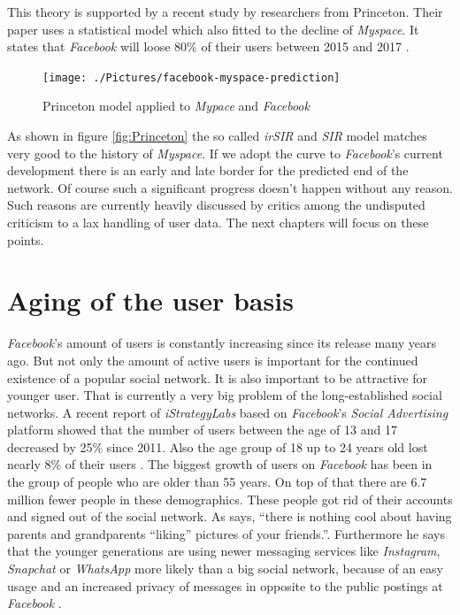 \documentclass[11pt,a4paper]{report}
\begin{document}
This theory is supported by a recent study by researchers from Princeton. Their paper uses a statistical model which also fitted to the decline of \emph{Myspace}. It states that \emph{Facebook} will loose 80\% of their users between 2015 and 2017 \cite{Cannarella:2014aa}. 
\begin{figure}[h]
    \centering
      \texttt{[image: ./Pictures/facebook-myspace-prediction]}
      \caption[Princeton model applied to \emph{Mypace} and \emph{Facebook} retrieved from \cite{Cannarella:2014aa}]{Princeton model applied to \emph{Mypace} and \emph{Facebook}}
      \label{fig:Princeton}
\end{figure}
As shown in figure \vref{fig:Princeton} the so called \emph{irSIR} and \emph{SIR} model matches very good to the history of \emph{Myspace}. If we adopt the curve to \emph{Facebook}'s current development there is an early and late border for the predicted end of the network. Of course such a significant progress doesn't happen without any reason. Such reasons are currently heavily discussed by critics among the undisputed criticism to a lax handling of user data. The next chapters will focus on these points.

\section{Aging of the user basis}
\emph{Facebook}'s amount of users is constantly increasing since its release many years ago. But not only the amount of active users is important for the continued existence of a popular social network. It is also important to be attractive for younger user. That is currently a very big problem of the long-established social networks. A recent report of \emph{iStrategyLabs} based on \emph{Facebook}'s \emph{Social Advertising} platform showed that the number of users between the age of 13 and 17 decreased by 25\% since 2011. Also the age group of 18 up to 24 years old lost nearly 8\% of their users \cite{Saul:2014aa} . The biggest growth of users on \emph{Facebook} has been in the group of people who are older than 55 years. On top of that there are 6.7 million fewer people in these demographics. These people got rid of their accounts and signed out of the social network. As \textcite{Neal:2014aa} says, \enquote{there is nothing cool about having parents and grandparents “liking” pictures of your friends.}. Furthermore he says that the younger generations are using newer messaging services like \emph{Instagram}, \emph{Snapchat} or \emph{WhatsApp} more likely than a big social network, because of an easy usage and an increased privacy of messages in opposite to the public postings at \emph{Facebook} \cite{Neal:2013aa}.
\end{document}

